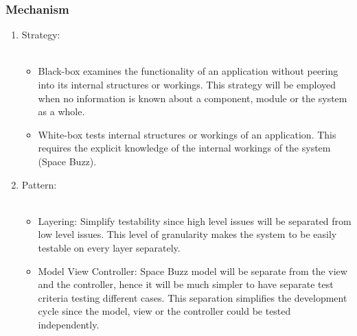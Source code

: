 	\subsubsection*{Mechanism}
		\begin{enumerate}
			\item Strategy:\\\\
		\begin{itemize}
			\item	Black-box examines the functionality of an application without peering into its internal structures or workings. This strategy will be employed when no information is known about a component, module or the system as a whole.
			\item	White-box tests internal structures or workings of an application. This requires the explicit knowledge of the internal workings of the system (Space Buzz).
		\end{itemize}
		
		
			 \item Pattern:\\\\
		 \begin{itemize}
			\item	Layering:  Simplify testability since high level issues will be separated from low level issues. This level of granularity makes the system to be easily testable on every layer separately.
			\item Model View Controller: Space Buzz model will be separate from the view and the controller, hence it will be much simpler to have separate test criteria testing different cases. This separation simplifies the development cycle since the model, view or the controller could be tested independently. 
		\end{itemize}
\end{enumerate}
